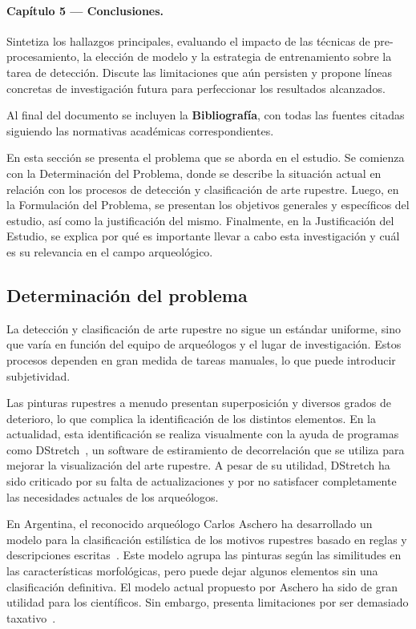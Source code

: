 \paragraph{Capítulo 5 — Conclusiones.}
Sintetiza los hallazgos principales, evaluando el impacto de las técnicas de pre-procesamiento, la elección de modelo y la estrategia de entrenamiento sobre la tarea de detección.
Discute las limitaciones que aún persisten y propone líneas concretas de investigación futura para perfeccionar los resultados alcanzados.

\bigskip
Al final del documento se incluyen la \textbf{Bibliografía}, con todas las fuentes citadas siguiendo las normativas académicas correspondientes.

En esta sección se presenta el problema que se aborda en el estudio.
Se comienza con la Determinación del Problema, donde se describe la situación actual en relación con los procesos de detección y clasificación de arte rupestre.
Luego, en la Formulación del Problema, se presentan los objetivos generales y específicos del estudio, así como la justificación del mismo.
Finalmente, en la Justificación del Estudio, se explica por qué es importante llevar a cabo esta investigación y cuál es su relevancia en el campo arqueológico.

\subsection{Determinación del problema}

La detección y clasificación de arte rupestre no sigue un estándar uniforme, sino que varía en función del equipo de arqueólogos y el lugar de investigación.
Estos procesos dependen en gran medida de tareas manuales, lo que puede introducir subjetividad.

Las pinturas rupestres a menudo presentan superposición y diversos grados de deterioro, lo que complica la identificación de los distintos elementos.
En la actualidad, esta identificación se realiza visualmente con la ayuda de programas como DStretch~\cite{dstretch}, un software de estiramiento de decorrelación que se utiliza para mejorar la visualización del arte rupestre.
A pesar de su utilidad, DStretch ha sido criticado por su falta de actualizaciones y por no satisfacer completamente las necesidades actuales de los arqueólogos.

En Argentina, el reconocido arqueólogo Carlos Aschero ha desarrollado un modelo para la clasificación estilística de los motivos rupestres basado en reglas y descripciones escritas~\cite{aschero2012}.
Este modelo agrupa las pinturas según las similitudes en las características morfológicas, pero puede dejar algunos elementos sin una clasificación definitiva.
El modelo actual propuesto por Aschero ha sido de gran utilidad para los científicos. Sin embargo, presenta limitaciones por ser demasiado taxativo~\cite{aschero2000}.

